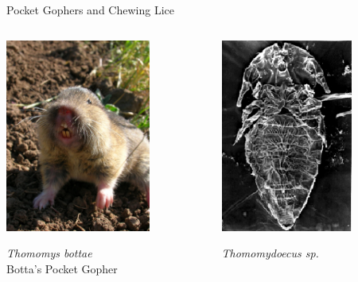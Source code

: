 \documentclass{beamer}
\begin{document}
\begin{frame}{Pocket Gophers and Chewing Lice}

\begin{columns}

\begin{column}{0.5\textwidth}
\centering
\includegraphics[height=2.5in]{figures/gophers/145893468_d8ad1675c0_o.jpg}

\emph{Thomomys bottae}\\\small Botta's Pocket Gopher
\end{column}

\begin{column}{0.5\textwidth}
\centering
\includegraphics[height=2.5in]{figures/louse/thomomydoecus.png}

\emph{Thomomydoecus sp.}\\\small \hfil

\end{column}

\end{columns}

\end{frame}
\end{document}
